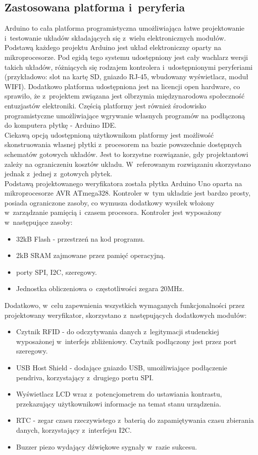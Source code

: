 \documentclass[declaration,shortabstract, mgr]{iithesis}
\begin{document}
\subsection{Zastosowana platforma i~peryferia}
\indent Arduino to cała platforma programistyczna umożliwiająca łatwe projektowanie i~testowanie układów składających się z~wielu elektronicznych modułów. Podstawą każdego projektu Arduino jest układ elektroniczny oparty na mikroprocesorze. Pod egidą tego systemu udostępniony jest cały wachlarz wersji takich układów, różniących się rodzajem kontrolera i~udostępnionymi peryferiami (przykładowo: slot na kartę SD, gniazdo RJ-45, wbudowany wyświetlacz, moduł WIFI). Dodatkowo platforma udostępniona jest na licencji open hardware, co sprawiło, że z~projektem związana jest olbrzymia międzynarodowa społeczność entuzjastów elektroniki. Częścią platformy jest również środowisko programistyczne umożliwiające wgrywanie własnych programów na podłączoną do komputera płytkę - Arduino IDE.\\
\indent Ciekawą opcją udostępnioną użytkownikom platformy jest możliwość skonstruowania własnej płytki z~procesorem na bazie powszechnie dostępnych schematów gotowych układów. Jest to korzystne rozwiązanie, gdy projektantowi zależy na ograniczeniu kosztów układu. W~referowanym rozwiązaniu skorzystano jednak z~jednej z~gotowych płytek.\\
\indent Podstawą projektowanego weryfikatora została płytka Arduino Uno oparta na mikroprocesorze AVR ATmega328. Kontroler w~tym układzie jest bardzo prosty, posiada ograniczone zasoby, co wymusza dodatkowy wysiłek włożony w~zarządzanie pamięcią i~czasem procesora. Kontroler jest wyposażony w~następujące zasoby:
\begin{itemize}
\item 32kB Flash - przestrzeń na kod programu.
\item 2kB SRAM zajmowane przez pamięć operacyjną.
\item porty SPI, I2C, szeregowy.
\item Jednostka obliczeniowa o~częstotliwości zegara 20MHz.
\end{itemize}
\indent Dodatkowo, w~celu zapewnienia wszystkich wymaganych funkcjonalności przez projektowany weryfikator, skorzystano z~następujących dodatkowych modułów:
\begin{itemize}
\item Czytnik RFID - do odczytywania danych z~legitymacji studenckiej wyposażonej w~interfejs zbliżeniowy. Czytnik podłączony jest przez port szeregowy.
\item USB Host Shield - dodające gniazdo USB, umożliwiające podłączenie pendriva, korzystający z~drugiego portu SPI.
\item Wyświetlacz LCD wraz z~potencjometrem do ustawiania kontrastu, przekazujący użytkownikowi informacje na temat stanu urządzenia.
\item RTC - zegar czasu rzeczywistego z~baterią do zapamiętywania czasu zbierania danych, korzystający z~interfejsu I2C.
\item Buzzer piezo wydający dźwiękowe sygnały w~razie sukcesu.
\end{itemize}
\end{document}
